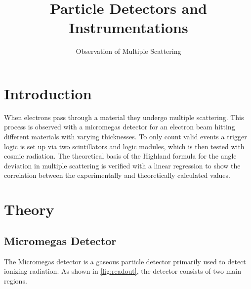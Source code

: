\documentclass[sn-mathphys-num,iicol]{sn-jnl}
\theoremstyle{thmstyleone}
\theoremstyle{thmstyletwo}
\theoremstyle{thmstylethree}
\begin{document}
        
\title[]{Particle Detectors and Instrumentations}
\subtitle{Observation of Multiple Scattering}
\author*[1]{ }
\author*[1]{ }
\author*[1]{ }
\author*[1]{ }
\author*[1]{ }

\maketitle

\section{Introduction}

When electrons pass through a material they undergo multiple scattering.
This process is observed with a micromegas detector for an electron beam hitting different materials with varying thicknesses.
To only count valid events a trigger logic is set up via two scintillators and logic modules, which is then tested with cosmic radiation.
The theoretical basis of the Highland formula for the angle deviation in multiple scattering is verified with a linear regression to show the correlation between the experimentally and theoretically calculated values.


\section{Theory}\label{sec:theory}
\subsection{Micromegas Detector}\label{subsec:theory_micromegas}
The Micromegas detector is a gaseous particle detector primarily used to detect ionizing radiation.
As shown in \autoref{fig:readout}, the detector consists of two main regions. 
\end{document}
